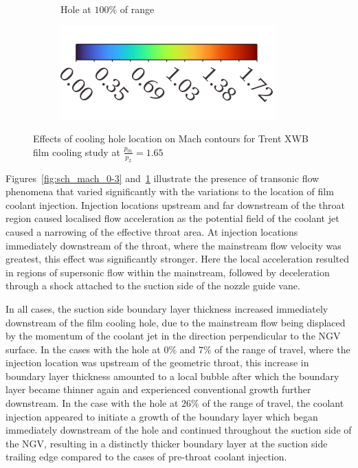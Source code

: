 \documentclass[a4paper, 11pt, oneside]{report}
\begin{document}
\begin{figure}[H]
\begin{subfigure}{.42\textwidth}
		\caption{Hole at $100\%$ of range}
	\end{subfigure}
	\begin{subfigure}{.4\textwidth}
		\centering
		\includegraphics[width=\linewidth]{figs/mach_legend_choked_horizontal.png}
	\end{subfigure}
	\caption{Effects of cooling hole location on Mach contours for Trent XWB film cooling study at $\frac{p_{01}}{p_2}=1.65$}
	\label{fig:sch_mach_4-6}
\end{figure}

Figures~\ref{fig:sch_mach_0-3} and~\ref{fig:sch_mach_4-6} illustrate the presence of transonic flow phenomena that varied significantly with the variations to the location of film coolant injection. Injection locations upstream and far downstream of the throat region caused localised flow acceleration as the potential field of the coolant jet caused a narrowing of the effective throat area. At injection locations immediately downstream of the throat, where the mainstream flow velocity was greatest, this effect was significantly stronger. Here the local acceleration resulted in regions of supersonic flow within the mainstream, followed by deceleration through a shock attached to the suction side of the nozzle guide vane. 

In all cases, the suction side boundary layer thickness increased immediately downstream of the film cooling hole, due to the mainstream flow being displaced by the momentum of the coolant jet in the direction perpendicular to the NGV surface. In the cases with the hole at $0\%$ and $7\%$ of the range of travel, where the injection location was upstream of the geometric throat, this increase in boundary layer thickness amounted to a local bubble after which the boundary layer became thinner again and experienced conventional growth further downstream. In the case with the hole at $26\%$ of the range of travel, the coolant injection appeared to initiate a growth of the boundary layer which began immediately downstream of the hole and continued throughout the suction side of the NGV, resulting in a distinctly thicker boundary layer at the suction side trailing edge compared to the cases of pre-throat coolant injection.
\end{document}
